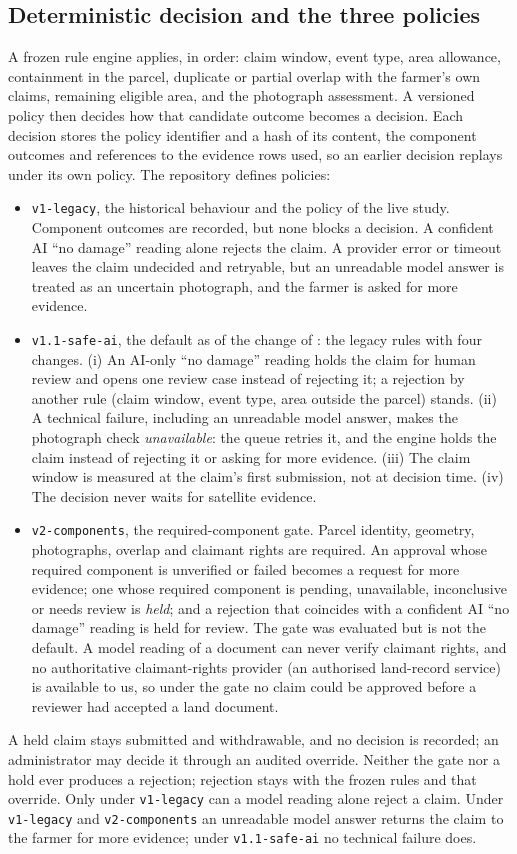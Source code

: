 \documentclass{ieeeaccess}
\begin{document}
\subsection{Deterministic decision and the three policies}\label{sec:policies}
A frozen rule engine applies, in order: claim window, event type, area allowance, containment in the parcel, duplicate or partial overlap with the farmer's own claims, remaining eligible area, and the photograph assessment. A versioned policy then decides how that candidate outcome becomes a decision. Each decision stores the policy identifier and a hash of its content, the component outcomes and references to the evidence rows used, so an earlier decision replays under its own policy. The repository defines \PolicyCountWord{} policies:
\begin{itemize}
\item \texttt{v1-legacy}, the historical behaviour and the policy of the live study. Component outcomes are recorded, but none blocks a decision. A confident AI ``no damage'' reading alone rejects the claim. A provider error or timeout leaves the claim undecided and retryable, but an unreadable model answer is treated as an uncertain photograph, and the farmer is asked for more evidence.
\item \texttt{v1.1-safe-ai}, the default as of the change of \PolicySafeAiDate{}: the legacy rules with four changes. (i) An AI-only ``no damage'' reading holds the claim for human review and opens one review case instead of rejecting it; a rejection by another rule (claim window, event type, area outside the parcel) stands. (ii) A technical failure, including an unreadable model answer, makes the photograph check \emph{unavailable}: the queue retries it, and the engine holds the claim instead of rejecting it or asking for more evidence. (iii) The claim window is measured at the claim's first submission, not at decision time. (iv) The decision never waits for satellite evidence.
\item \texttt{v2-components}, the required-component gate. Parcel identity, geometry, photographs, overlap and claimant rights are required. An approval whose required component is unverified or failed becomes a request for more evidence; one whose required component is pending, unavailable, inconclusive or needs review is \emph{held}; and a rejection that coincides with a confident AI ``no damage'' reading is held for review. The gate was evaluated but is not the default. A model reading of a document can never verify claimant rights, and no authoritative claimant-rights provider (an authorised land-record service) is available to us, so under the gate no claim could be approved before a reviewer had accepted a land document.
\end{itemize}
A held claim stays submitted and withdrawable, and no decision is recorded; an administrator may decide it through an audited override. Neither the gate nor a hold ever produces a rejection; rejection stays with the frozen rules and that override. Only under \texttt{v1-legacy} can a model reading alone reject a claim. Under \texttt{v1-legacy} and \texttt{v2-components} an unreadable model answer returns the claim to the farmer for more evidence; under \texttt{v1.1-safe-ai} no technical failure does.
\end{document}
